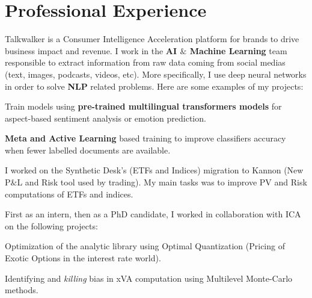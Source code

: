 \documentclass[]{deedy-resume-openfont}
\begin{document}
\lastupdated




\vspace{\topsep}

\section{Professional Experience}
\sectionsep

Talkwalker is a Consumer Intelligence Acceleration platform for brands to drive business impact and revenue. I work in the \textbf{AI $\&$ Machine Learning} team responsible to extract information from raw data coming from social medias (text, images, podcasts, videos, etc). More specifically, I use deep neural networks in order to solve \textbf{NLP} related problems. Here are some examples of my projects: $ $
\vspace{0.1cm}
\begin{tightemize}
	\item[\diamond] Train models using \textbf{pre-trained multilingual transformers models} for aspect-based sentiment analysis or emotion prediction.
	\item[\diamond] \textbf{Meta and Active Learning} based training to improve classifiers accuracy when fewer labelled documents are available.
\end{tightemize}

\sectionsep
\sectionsep

I worked on the Synthetic Desk's (ETFs and Indices) migration to Kannon (New P$\&$L and Risk tool used by trading). My main tasks was to improve PV and Risk computations of ETFs and indices.

\sectionsep
\sectionsep


First as an intern, then as a PhD candidate, I worked in collaboration with ICA on the following projects:
\vspace{0.1cm}
\begin{tightemize}
	\item[\diamond] Optimization of the analytic library using Optimal Quantization (Pricing of Exotic Options in the interest rate world).
	\item[\diamond] Identifying and \textit{killing} bias in xVA computation using Multilevel Monte-Carlo methods.
\end{tightemize}
\end{document}
